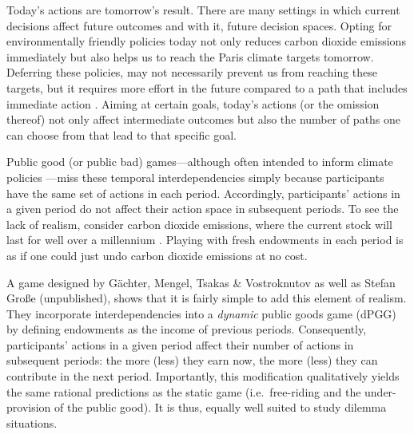 \documentclass[
  authoryear,
  review,
  3p,
  onecolumn]{elsarticle}
\begin{document}
Today's actions are tomorrow's result. There are many settings in which
current decisions affect future outcomes and with it, future decision
spaces. Opting for environmentally friendly policies today not only
reduces carbon dioxide emissions immediately but also helps us to reach
the Paris climate targets tomorrow. Deferring these policies, may not
necessarily prevent us from reaching these targets, but it requires more
effort in the future compared to a path that includes immediate action
\citep{HaenselEtAl2022}. Aiming at certain goals, today's actions (or
the omission thereof) not only affect intermediate outcomes but also the
number of paths one can choose from that lead to that specific goal.

Public good (or public bad) games---although often intended to inform
climate policies
\citep[e.g.][]{MilinskiEtAl2006, TavoniEtAl2011, Hauser2014, BrickEtAl2015, GomezEtAl2018, CalzolariEtAl2018, CookEtAl2019}---miss
these temporal interdependencies simply because participants have the
same set of actions in each period. Accordingly, participants' actions
in a given period do not affect their action space in subsequent
periods. To see the lack of realism, consider carbon dioxide emissions,
where the current stock will last for well over a millennium
\citep{Inman2008, CalzolariEtAl2018}. Playing with fresh endowments in
each period is as if one could just undo carbon dioxide emissions at no
cost.

A game designed by Gächter, Mengel, Tsakas \& Vostroknutov \citeyearpar[
hereafter, GMTV]{GMTV2017} as well as Stefan Große (unpublished), shows
that it is fairly simple to add this element of realism. They
incorporate interdependencies into a \emph{dynamic} public goods game
(dPGG) by defining endowments as the income of previous periods.
Consequently, participants' actions in a given period affect their
number of actions in subsequent periods: the more (less) they earn now,
the more (less) they can contribute in the next period. Importantly,
this modification qualitatively yields the same rational predictions as
the static game (i.e.~free-riding and the under-provision of the public
good). It is thus, equally well suited to study dilemma situations.
\end{document}
